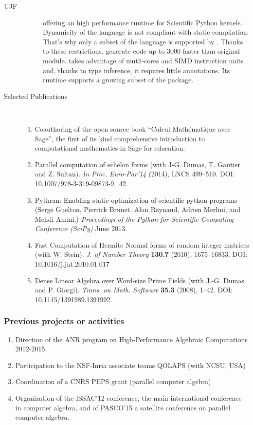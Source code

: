 \begin{sitedescription}{UJF}
\begin{description}
\begin{description}
    offering an high performance runtime for Scientific Python kernels. Dynamicity of
    the \Python language is not compliant with static compilation. That's why only
    a subset of the \Python language is supported by \Pythran. Thanks to these
    restrictions, \Pythran generate code up to 3000 faster than original module.
    \Pythran takes advantage of mutli-cores and SIMD instruction units and,
    thanks to type inference, it requires little annotations. Its runtime
    supports a growing subset of the \Numpy package.
  \end{description}
\item[Selected Publications]\ 
\medskip\noindent
\begin{enumerate}[1.]
\item Coauthoring of the open source book ``Calcul Mathématique avec
  Sage'', the first of its kind comprehensive introduction to
  computational mathematics in Sage for education.

\item Parallel computation of echelon forms (with J-G. Dumas, T. Gautier and Z. Sultan). 
\emph{In Proc. Euro-Par'14}  (2014),  LNCS 499--510. DOI: 10.1007/978-3-319-09873-9\_42.

\item Pythran: Enabling static optimization of scientific python programs
  (Serge Guelton, Pierrick Brunet, Alan Raynaud, Adrien Merlini, and Mehdi Amini.)
\emph{Proceedings of the Python for Scientific Computing Conference (SciPy)} June 2013.

\item Fast Computation of Hermite Normal forms of random integer matrices (with
W. Stein).
\emph{J. of Number Theory} {\bf{130.7}} (2010), 1675--16833. DOI: 10.1016/j.jnt.2010.01.017

\item Dense Linear Algebra over Word-size Prime Fields (with J.-G. Dumas and P. Giorgi). 
\emph{Trans. on Math. Software} {\bf{35.3}} (2008), 1--42. DOI: 10.1145/1391989.1391992.
\end{enumerate}

\end{description}

\subsubsection*{Previous projects or activities}

\begin{enumerate}
\item Direction of the ANR program on High-Performance Algebraic
  Computations 2012-2015.
\item Participation to the NSF-Inria associate teams QOLAPS (with NCSU, USA)
\item Coordination of a CNRS PEPS grant (parallel computer algebra)
\item Organization of the ISSAC'12 conference, the main
  international conference in computer algebra, and of PASCO'15 a satellite
  conference on parallel computer algebra.
\end{enumerate}


\end{sitedescription}
